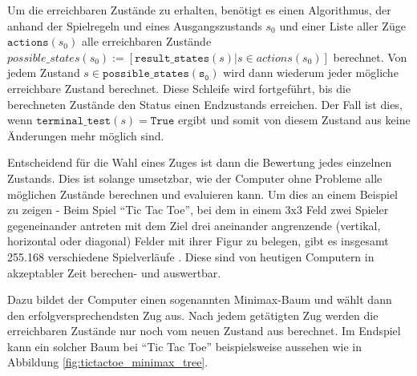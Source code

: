 Um die erreichbaren Zustände zu erhalten, benötigt es einen Algorithmus, der anhand der Spielregeln und eines Ausgangszustands $s_0$ und einer Liste aller Züge $\mathtt{actions}(s_0)$ alle erreichbaren Zustände $possible\_states(s_0) := [\mathtt{result\_states}(s) | s \in actions(s_0)]$ berechnet. Von jedem Zustand $s \in \mathtt{possible\_states(s_0)}$ wird dann wiederum jeder mögliche erreichbare Zustand berechnet. Diese Schleife wird fortgeführt, bis die berechneten Zustände den Status einen Endzustands erreichen. Der Fall ist dies, wenn $\mathtt{terminal\_test}(s) = \mathtt{True}$ ergibt und somit von diesem Zustand aus keine Änderungen mehr möglich sind.

Entscheidend für die Wahl eines Zuges ist dann die Bewertung jedes einzelnen Zustands. Dies ist solange umsetzbar, wie der Computer ohne Probleme alle möglichen Zustände berechnen und evaluieren kann. Um dies an einem Beispiel zu zeigen - Beim Spiel ``Tic Tac Toe'', bei dem in einem 3x3 Feld zwei Spieler gegeneinander antreten mit dem Ziel drei aneinander angrenzende (vertikal, horizontal oder diagonal) Felder mit ihrer Figur zu belegen, gibt es insgesamt 255.168 verschiedene Spielverläufe \cite{Kaplan2017}. Diese sind von heutigen Computern in akzeptabler Zeit berechen- und auswertbar.


Dazu bildet der Computer einen sogenannten Minimax-Baum und wählt dann den erfolgversprechendsten Zug aus. Nach jedem getätigten Zug werden die erreichbaren Zustände nur noch vom neuen Zustand aus berechnet. Im Endspiel kann ein solcher Baum bei ``Tic Tac Toe'' beispielsweise aussehen wie in Abbildung \ref{fig:tictactoe_minimax_tree}.

